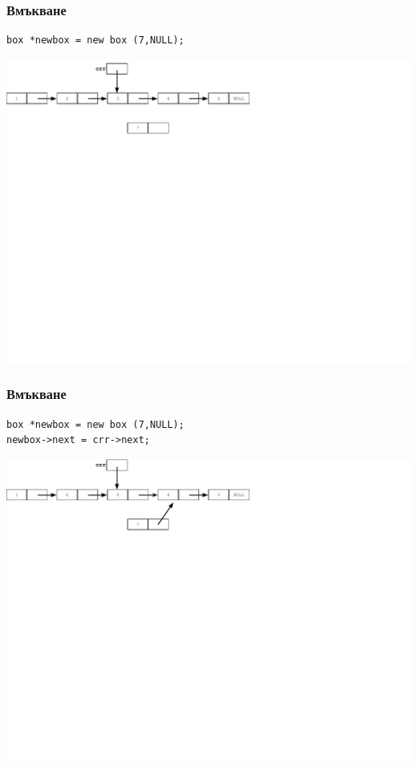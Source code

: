 \documentclass{beamer}
\begin{document}
\begin{frame}[fragile]
\frametitle{Вмъкване}

\begin{flushleft}
\begin{lstlisting}
box *newbox = new box (7,NULL);
\end{lstlisting}  
\end{flushleft}


\includegraphics[width=14.0cm]{images/05_ll_insert_start}

\end{frame}

\begin{frame}[fragile]
\frametitle{Вмъкване}

\begin{flushleft}
\begin{lstlisting}
box *newbox = new box (7,NULL);
newbox->next = crr->next;
\end{lstlisting}  
\end{flushleft}


\includegraphics[width=14.0cm]{images/05_ll_insert_firstlink}

\end{frame}
\end{document}
